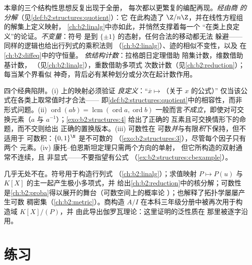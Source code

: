 \begin{remark}[展望：值得留意的三条主旋律]\label{rem:b2:structures:perspectives}
本章的三个结构性思想反复出现于全册，
每次都以更繁复的编配再现。\emph{经由商
的分解}（见\cref{def:b2:structures:quotient}）：它
在此构造了 $\Z/n\Z$，并在线性方程组的解集上定义映射，
\cref{ch:b2:linalg}中亦如此，并悄然支撑着每一个
“在类上良定义”的论证。\emph{不变量}：符号
是到 $\{\pm1\}$ 的态射，任何合法的移动都无法
躲避——同样的逻辑也给出行列式的乘积法则
（\cref{ch:b2:linalg}）、迹的相似不变性，以及
在\cref{ch:b2:diffeq}中的守恒量。
\emph{依结构计数}：拉格朗日定理借助
陪集计数，维数借助基计数，
（见\cref{ch:b2:linalg}），重数借助多项式
次数计数（见\cref{ch:b2:reduction}）；每当某个界看似
神奇，背后必有某种划分或分次在起计数作用。
\end{remark}

\begin{remark}[常见陷阱]\label{rem:b2:structures:pitfalls}
四个经典陷阱。(i) 上的映射必须验证
\emph{良定义}：“$\overline x \mapsto$（关于 $x$ 的公式）”
仅当该公式在各类上取常值时才合法——
即\cref{def:b2:structures:quotient}中的相容性，而非
形式问题。(ii) $\operatorname{ord}(ab) =
\operatorname{lcm}(\operatorname{ord}a, \operatorname{ord}b)$
一般而言\emph{不成立}，即使对可交换元素（$a$
与 $a^{-1}$）；\cref{exo:b2:structures:4} 给出了正确的
互素且可交换情形下的命题，而不交则给出
正确的置换版本。(iii) 可数性在
可数\emph{并}与有限\emph{积}下保持，但不适用于
可数积：$\{0,1\}^{\N}$ 是不可数的
（\cref{exo:b2:structures:3}），尽管每个因子只有两个
元素。(iv) 康托--伯恩斯坦定理只需两个方向的单射，
但它所构造的双射通常不连续，且
非显式——不要指望有公式
（\cref{ex:b2:structures:cbexample}）。
\end{remark}

\begin{remark}[本章的应用]
几乎无处不在。符号用于构造行列式
（\cref{ch:b2:linalg}）；求值映射 $P \mapsto P(u)$
与 $K[X]$ 的主一起产生极小多项式，并
给出\cref{ch:b2:reduction}中的核分解；可数性
是\cref{ch:b2:proba}得以展开的舞台（可数空间上的概率论
）；也解释了拓扑学屡屡产生可数
稠密集（\cref{ch:b2:metric}）。商构造 $A/I$
在本科三年级分册中被再次用于构造域 $K[X]/(P)$，并
由此导出伽罗瓦理论：这里证明的泛性质在
那里被逐字沿用。
\end{remark}

\section{练习}

